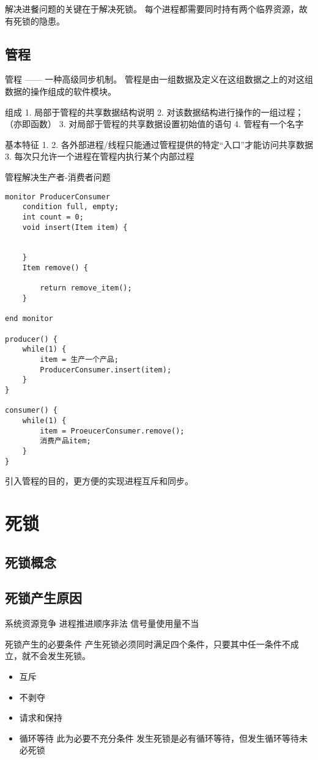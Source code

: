 解决进餐问题的关键在于解决死锁。
每个进程都需要同时持有两个临界资源，故有死锁的隐患。

\subsection{管程}
管程 —— 一种高级同步机制。
管程是由一组数据及定义在这组数据之上的对这组数据的操作组成的软件模块。

组成
1. 局部于管程的共享数据结构说明
2. 对该数据结构进行操作的一组过程；（亦即函数）
3. 对局部于管程的共享数据设置初始值的语句
4. 管程有一个名字

基本特征
1. 
2. 各外部进程/线程只能通过管程提供的特定“入口”才能访问共享数据
3. 每次只允许一个进程在管程内执行某个内部过程



管程解决生产者-消费者问题
\begin{lstlisting}
monitor ProducerConsumer
	condition full, empty;
	int count = 0;
	void insert(Item item) {
		
		
	}
	Item remove() {
	
		return remove_item();
	}

end monitor

producer() {
	while(1) {
		item = 生产一个产品;
		ProducerConsumer.insert(item);
	}
}

consumer() {
	while(1) {
		item = ProeucerConsumer.remove();
		消费产品item;
	}
}
\end{lstlisting}

引入管程的目的，更方便的实现进程互斥和同步。


\section{死锁}

\subsection{死锁概念}
\subsection{死锁产生原因}
系统资源竞争
进程推进顺序非法
信号量使用量不当

死锁产生的必要条件
产生死锁必须同时满足四个条件，只要其中任一条件不成立，就不会发生死锁。

\begin{itemize}
	\item 互斥
	\item 不剥夺
	\item 请求和保持
	\item 循环等待 此为必要不充分条件
			发生死锁是必有循环等待，但发生循环等待未必死锁
\end{itemize}

